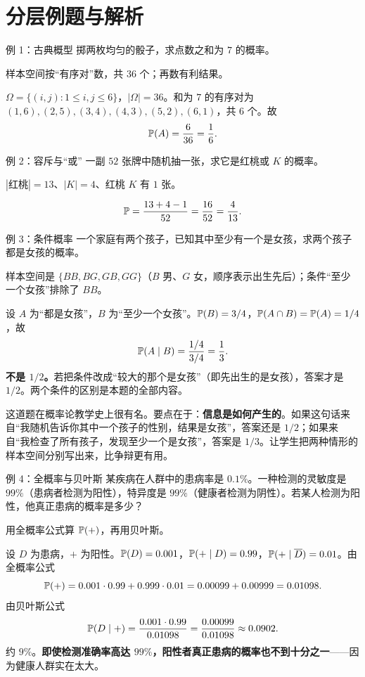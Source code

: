 \section{分层例题与解析}
\begin{problem}{例 1：古典概型}
掷两枚均匀的骰子，求点数之和为 $7$ 的概率。
\end{problem}
\hint 样本空间按“有序对”数，共 $36$ 个；再数有利结果。

\sol $\Omega=\{(i,j):1\le i,j\le6\}$，$|\Omega|=36$。和为 $7$ 的有序对为 $(1,6),(2,5),(3,4),(4,3),(5,2),(6,1)$，共 $6$ 个。故
\[
\mathbb P(A)=\frac6{36}=\frac16.
\]

\begin{problem}{例 2：容斥与“或”}
一副 $52$ 张牌中随机抽一张，求它是红桃或 $K$ 的概率。
\end{problem}
\hint $|\text{红桃}|=13$、$|K|=4$、红桃 $K$ 有 $1$ 张。

\sol
\[
\mathbb P=\frac{13+4-1}{52}=\frac{16}{52}=\frac4{13}.
\]

\begin{problem}{例 3：条件概率}
一个家庭有两个孩子，已知其中至少有一个是女孩，求两个孩子都是女孩的概率。
\end{problem}
\hint 样本空间是 $\{BB,BG,GB,GG\}$（$B$ 男、$G$ 女，顺序表示出生先后）；条件“至少一个女孩”排除了 $BB$。

\sol 设 $A$ 为“都是女孩”，$B$ 为“至少一个女孩”。$\mathbb P(B)=3/4$，$\mathbb P(A\cap B)=\mathbb P(A)=1/4$，故
\[
\mathbb P(A\mid B)=\frac{1/4}{3/4}=\frac13.
\]
\textbf{不是 $1/2$。}若把条件改成“较大的那个是女孩”（即先出生的是女孩），答案才是 $1/2$。两个条件的区别是本题的全部内容。

\begin{teach}
这道题在概率论教学史上很有名。要点在于：\textbf{信息是如何产生的}。如果这句话来自“我随机告诉你其中一个孩子的性别，结果是女孩”，答案还是 $1/2$；如果来自“我检查了所有孩子，发现至少一个是女孩”，答案是 $1/3$。让学生把两种情形的样本空间分别写出来，比争辩更有用。
\end{teach}

\begin{problem}{例 4：全概率与贝叶斯}
某疾病在人群中的患病率是 $0.1\%$。一种检测的灵敏度是 $99\%$（患病者检测为阳性），特异度是 $99\%$（健康者检测为阴性）。若某人检测为阳性，他真正患病的概率是多少？
\end{problem}
\hint 用全概率公式算 $\mathbb P(+)$，再用贝叶斯。

\sol 设 $D$ 为患病，$+$ 为阳性。$\mathbb P(D)=0.001$，$\mathbb P(+\mid D)=0.99$，$\mathbb P(+\mid\overline D)=0.01$。由全概率公式
\[
\mathbb P(+)=0.001\cdot0.99+0.999\cdot0.01=0.00099+0.00999=0.01098.
\]
由贝叶斯公式
\[
\mathbb P(D\mid +)=\frac{0.001\cdot0.99}{0.01098}=\frac{0.00099}{0.01098}\approx0.0902.
\]
约 $9\%$。\textbf{即使检测准确率高达 $99\%$，阳性者真正患病的概率也不到十分之一}——因为健康人群实在太大。

